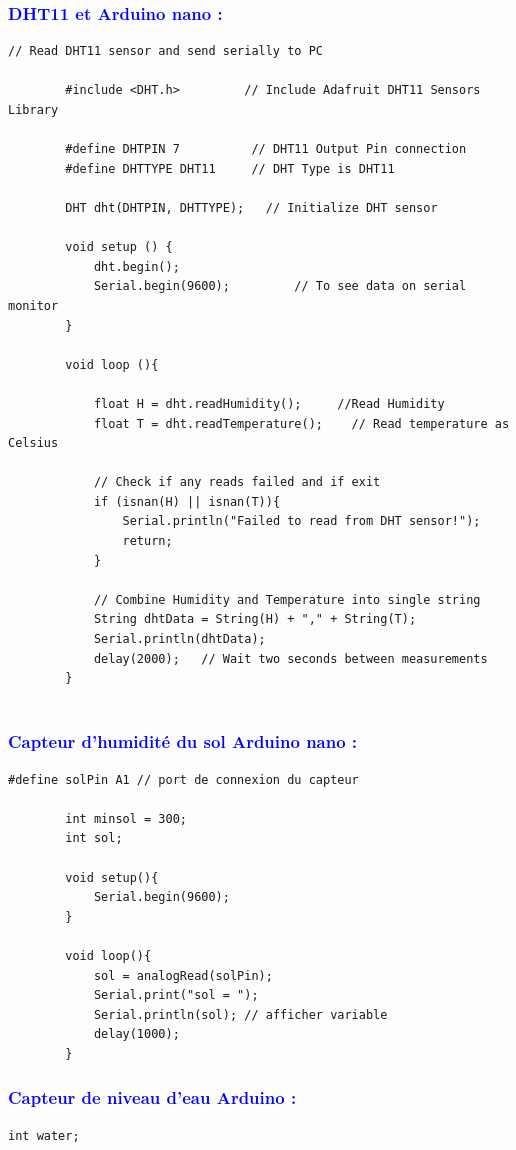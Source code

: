 \begin{flushleft}
	

	\subsubsection{\textcolor{blue}{DHT11 et Arduino nano :}}
	\begin{lstlisting}[style=CStyle]
		// Read DHT11 sensor and send serially to PC
		
		#include <DHT.h>         // Include Adafruit DHT11 Sensors Library
		
		#define DHTPIN 7          // DHT11 Output Pin connection
		#define DHTTYPE DHT11     // DHT Type is DHT11
		
		DHT dht(DHTPIN, DHTTYPE);   // Initialize DHT sensor
		
		void setup () {
			dht.begin();
			Serial.begin(9600);         // To see data on serial monitor
		}
		
		void loop (){
			
			float H = dht.readHumidity();     //Read Humidity
			float T = dht.readTemperature();    // Read temperature as Celsius
			
			// Check if any reads failed and if exit
			if (isnan(H) || isnan(T)){
				Serial.println("Failed to read from DHT sensor!");
				return;
			}
			
			// Combine Humidity and Temperature into single string
			String dhtData = String(H) + "," + String(T);
			Serial.println(dhtData);
			delay(2000);   // Wait two seconds between measurements
		}
		
	\end{lstlisting}
	
	\subsubsection{\textcolor{blue}{Capteur d’humidité du sol Arduino nano  :}}
	\begin{lstlisting}[style=CStyle]
		#define solPin A1 // port de connexion du capteur
		
		int minsol = 300; 
		int sol;
		
		void setup(){
			Serial.begin(9600);
		}
		
		void loop(){
			sol = analogRead(solPin);
			Serial.print("sol = ");
			Serial.println(sol); // afficher variable	
			delay(1000);
		}
	\end{lstlisting}
	
	\subsubsection{\textcolor{blue}{Capteur de niveau d’eau Arduino  :}}
	\begin{lstlisting}[style=CStyle]
		int water;
		

\end{lstlisting}
\end{flushleft}
